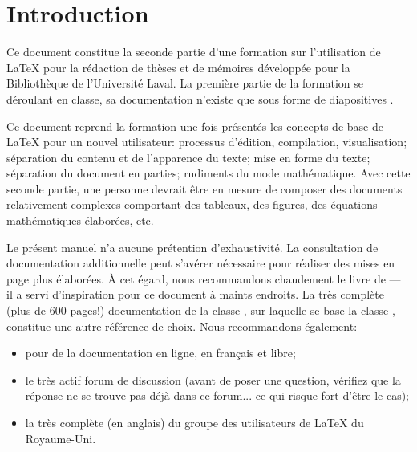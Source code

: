 \chapter{Introduction}
\label{chap:introduction}

Ce document constitue la seconde partie d'une formation sur
l'utilisation de {\LaTeX} pour la rédaction de thèses et de mémoires
développée pour la Bibliothèque de l'Université Laval. La première
partie de la formation se déroulant en classe, sa documentation
n'existe que sous forme de diapositives \citep{UL:latex:1}.

Ce document reprend la formation une fois présentés les concepts de
base de {\LaTeX} pour un nouvel utilisateur: processus d'édition,
compilation, visualisation; séparation du contenu et de l'apparence du
texte; mise en forme du texte; séparation du document en parties;
rudiments du mode mathématique. Avec cette seconde partie, une
personne devrait être en mesure de composer des documents relativement
complexes comportant des tableaux, des figures, des équations
mathématiques élaborées, etc.

Le présent manuel n'a aucune prétention d'exhaustivité. La
consultation de documentation additionnelle peut s'avérer nécessaire
pour réaliser des mises en page plus élaborées. À cet égard, nous
recommandons chaudement le livre de \cite{Kopka:latex:4e} --- il a
servi d'inspiration pour ce document à maints endroits. La très
complète (plus de 600 pages!) documentation de la classe
 \citep{memoir}, sur laquelle se base la classe
, constitue une autre référence de choix. Nous
recommandons également:
\begin{itemize}
\item {} pour de la documentation en ligne, en français et
  libre;
\item le très actif forum de discussion
  (avant de poser une question, vérifiez que la réponse ne se trouve
  pas déjà dans ce forum... ce qui risque fort d'être le cas);
\item la très complète
   (en anglais) du groupe des
  utilisateurs de {\LaTeX} du Royaume-Uni.
\end{itemize}

